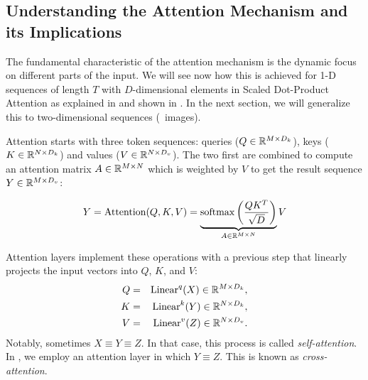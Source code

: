 \subsection{Understanding the Attention Mechanism and its Implications}
The fundamental characteristic of the attention mechanism is the dynamic focus on different parts of the input. We will see now how this is achieved for 1-D sequences of length $T$ with $D$-dimensional elements in Scaled Dot-Product Attention as explained in  and shown in . In the next section, we will generalize this to two-dimensional sequences (\ie~images).

Attention starts with three token sequences: queries ($Q\in \mathbb{R}^{M\times D_k}$), keys ($K\in \mathbb{R}^{N\times D_k}$) and values ($V\in \mathbb{R}^{N\times D_v}$). The two first are combined to compute an attention matrix $A\in \mathbb{R}^{M\times N}$ which is weighted by $V$ to get the result sequence $Y\in \mathbb{R}^{M\times D_v}$:

\begin{equation}
    Y = \text{Attention}(Q, K, V) = \underbrace{\operatorname{softmax}\left(\dfrac{QK^T}{\sqrt{D}}\right)}_{A \in \mathbb{R}^{M\times N}}V
    \label{eq:main_attention}
\end{equation}


Attention layers implement these operations with a previous step that linearly projects the input vectors into $Q$, $K$, and $V$:
\begin{eqnarray*}
    Q & = & \operatorname{Linear}^q(X) \in \mathbb{R}^{M\times D_k}, \\
    K & = & \operatorname{Linear}^k(Y) \in \mathbb{R}^{N\times D_k}, \\
    V & = & \operatorname{Linear}^v(Z) \in \mathbb{R}^{N\times D_v}.
\end{eqnarray*}
Notably, sometimes $X\equiv Y\equiv Z$. In that case, this process is called \textit{self-attention}. In , we employ an attention layer in which $Y\equiv Z$. This is known as \textit{cross-attention}.

